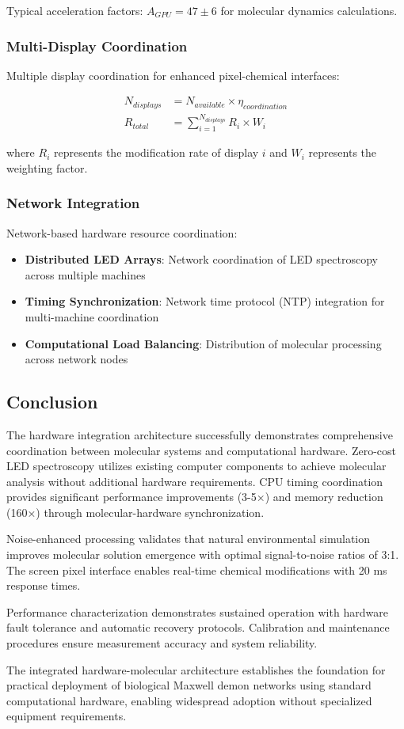 Typical acceleration factors: $A_{GPU} = 47 \pm 6$ for molecular dynamics calculations.

\subsubsection{Multi-Display Coordination}

Multiple display coordination for enhanced pixel-chemical interfaces:

\begin{align}
N_{displays} &= N_{available} \times \eta_{coordination} \\
R_{total} &= \sum_{i=1}^{N_{displays}} R_i \times W_i
\end{align}

where $R_i$ represents the modification rate of display $i$ and $W_i$ represents the weighting factor.

\subsubsection{Network Integration}

Network-based hardware resource coordination:

\begin{itemize}
\item \textbf{Distributed LED Arrays}: Network coordination of LED spectroscopy across multiple machines
\item \textbf{Timing Synchronization}: Network time protocol (NTP) integration for multi-machine coordination
\item \textbf{Computational Load Balancing}: Distribution of molecular processing across network nodes
\end{itemize}

\subsection{Conclusion}

The hardware integration architecture successfully demonstrates comprehensive coordination between molecular systems and computational hardware. Zero-cost LED spectroscopy utilizes existing computer components to achieve molecular analysis without additional hardware requirements. CPU timing coordination provides significant performance improvements (3-5×) and memory reduction (160×) through molecular-hardware synchronization.

Noise-enhanced processing validates that natural environmental simulation improves molecular solution emergence with optimal signal-to-noise ratios of 3:1. The screen pixel interface enables real-time chemical modifications with 20 ms response times.

Performance characterization demonstrates sustained operation with hardware fault tolerance and automatic recovery protocols. Calibration and maintenance procedures ensure measurement accuracy and system reliability.

The integrated hardware-molecular architecture establishes the foundation for practical deployment of biological Maxwell demon networks using standard computational hardware, enabling widespread adoption without specialized equipment requirements.
